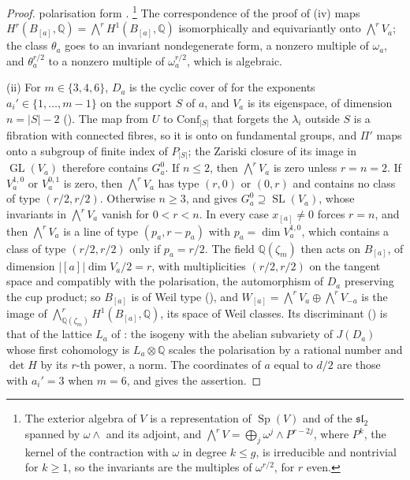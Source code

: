 \documentclass[11pt,reqno]{amsart}
\theoremstyle{plain}
\theoremstyle{definition}
\theoremstyle{remark}
\newcommand{\QQ}{\mathbb{Q}}
\DeclareMathOperator{\GL}{GL}
\DeclareMathOperator{\SL}{SL}
\DeclareMathOperator{\Sp}{Sp}
\begin{document}
\begin{proof}
polarisation form \cite[Theorem~17.5]{FH91}.%
\footnote{The exterior algebra of $V$ is a representation of $\Sp(V)$
and of the $\mathfrak{sl}_{2}$ spanned by $\omega\wedge{}$ and its adjoint,
and $\bigwedge^{r}V=\bigoplus_{j}\omega^{j}\wedge P^{r-2j}$, where $P^{k}$, the
kernel of the contraction with $\omega$ in degree $k\le g$, is irreducible
and nontrivial for $k\ge1$, so the invariants are the multiples of
$\omega^{r/2}$, for $r$ even.} The correspondence of the proof of
(iv) maps $H^{r}(B_{[a]},\QQ)=\bigwedge^{r}H^{1}(B_{[a]},
\QQ)$ isomorphically and equivariantly onto $\bigwedge^{r}V_{a}$; the class
$\theta_{a}$ goes to an invariant nondegenerate form, a nonzero multiple of
$\omega_{a}$, and $\theta_{a}^{r/2}$ to a nonzero multiple of
$\omega_{a}^{r/2}$, which is algebraic.

(ii) For $m\in\{3,4,6\}$, $D_{a}$ is the cyclic cover of 
for the exponents $a_{i}'\in\{1,\dots,m-1\}$ on the support $S$ of $a$, and
$V_{a}$ is its eigenspace, of dimension $n=|S|-2$ (). The
map from $U$ to $\mathrm{Conf}_{|S|}$ that forgets the $\lambda_{i}$ outside
$S$ is a fibration with connected fibres, so it is onto on fundamental groups,
and $\Pi'$ maps onto a subgroup of finite index of $P_{|S|}$; the Zariski
closure of its image in $\GL(V_{a})$ therefore contains $G_{a}^{0}$. If
$n\le2$, then $\bigwedge^{r}V_{a}$ is zero unless $r=n=2$. If $V_{a}^{1,0}$ or
$V_{a}^{0,1}$ is zero, then $\bigwedge^{r}V_{a}$ has type $(r,0)$ or $(0,r)$
and contains no class of type $(r/2,r/2)$. Otherwise $n\ge3$, and
 gives $G_{a}^{0}\supseteq\SL(V_{a})$, whose
invariants in $\bigwedge^{r}V_{a}$ vanish for $0<r<n$. In every case
$x_{[a]}\ne0$ forces $r=n$, and then $\bigwedge^{r}V_{a}$ is a line of type
$(p_{a},r-p_{a})$ with $p_{a}=\dim V_{a}^{1,0}$, which contains a class of type
$(r/2,r/2)$ only if $p_{a}=r/2$. The field $\QQ(\zeta_{m})$ then acts on
$B_{[a]}$, of dimension $|[a]|\dim V_{a}/2=r$, with multiplicities
$(r/2,r/2)$ on the tangent space and compatibly with the polarisation, the
automorphism of $D_{a}$ preserving the cup product; so $B_{[a]}$ is of Weil
type (\cite[Definition~3.1]{paperI}), and
$W_{[a]}=\bigwedge^{r}V_{a}\oplus\bigwedge^{r}V_{-a}$ is the image of
$\bigwedge^{r}_{\QQ(\zeta_{m})}H^{1}(B_{[a]},\QQ)$, its space of Weil classes.
Its discriminant (\cite[Definition~15.22]{paperI}) is that of the lattice $L_{a}$ of
: the isogeny with the abelian subvariety of $J(D_{a})$
whose first cohomology is $L_{a}\otimes\QQ$ scales the polarisation by a
rational number and $\det H$ by its $r$-th power, a norm. The coordinates of
$a$ equal to $d/2$ are those with $a_{i}'=3$ when $m=6$, and
 gives the assertion.


\end{proof}
\end{document}
